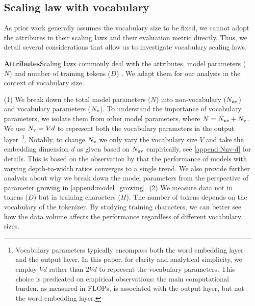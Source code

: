 \subsection{Scaling law with vocabulary}
\label{sec:preliminaries}
As prior work generally assumes the vocabulary size to be fixed, we cannot adopt the attributes in their scaling laws and their evaluation metric directly. Thus, we detail several considerations that allow us to investigate vocabulary scaling laws.


\textbf{Attributes}\;\;\;\;Scaling laws commonly deal with the attributes, model parameters ($N$) and number of training tokens ($D$) \citep{hoffmann2022training,muennighoff2024scaling}. We adapt them for our analysis in the context of vocabulary size.
{(1) We break down the total model parameters ($N$) into non-vocabulary ($N_{\rm nv}$) and vocabulary parameters ($N_{\rm v}$). To understand the importance of vocabulary parameters, we isolate them from other model parameters, where $N=N_{\rm nv}+N_{\rm v}$.
We use $N_{\rm v}=Vd$ to represent both the vocabulary parameters in the output layer~\footnote{Vocabulary parameters typically encompass both the word embedding layer and the output layer. In this paper, for clarity and analytical simplicity, we employ $Vd$ rather than $2Vd$ to represent the vocabulary parameters. This choice is predicated on empirical observations: the main computational burden, as measured in FLOPs, is associated with the output layer, but not the word embedding layer.}. 
Notably, to change $N_{\rm v}$ we only vary the vocabulary size $V$ and take the embedding dimension $d$ as given based on $N_{\rm nv}$ empirically, see \autoref{append:Nnv-d} for details. This is based on the observation by \citet{kaplan2020scaling} that the performance of models with varying depth-to-width ratios converges to a single trend. We also provide further analysis about why we break down the model parameters from the perspective of parameter growing in \autoref{append:model_growing}.
(2) We measure data  not in tokens ($D$) but in training characters ($H$). The number of tokens depends on the vocabulary of the tokenizer. By studying training characters, we can better see how the data volume affects the performance regardless of different vocabulary sizes.



}
